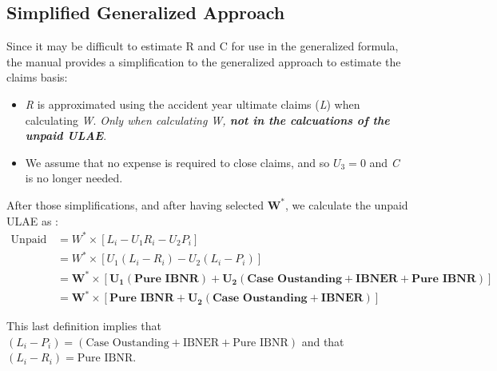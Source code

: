 \documentclass[11pt, english]{memoir}
\numberwithin{definition}{section}
\begin{document}
\subsection{Simplified Generalized Approach}	
	Since it may be difficult to estimate R and C for use in the generalized formula, the manual provides a simplification to the generalized approach to estimate the claims basis:
	\begin{itemize}
		\item \emph{R} is approximated using the accident year ultimate claims (\emph{L}) when calculating \emph{W}. \emph{Only when calculating \emph{W}, \textbf{not in the calcuations of the unpaid ULAE}}. 
		\item We assume that no expense is required to close claims, and so $ U_{3} = 0$ and \emph{C} is no longer needed. 
	\end{itemize}
	After those simplifications, and after having selected $ \mathbf{W^{*}} $, we calculate the unpaid ULAE as :
	\begin{align*}
	\text{Unpaid ULAE} &= W^{*} \times \left[ L_{i} - U_{1}R_{i} - U_{2}P_{i}\right]\\
	&= W^{*} \times \left[ U_{1}(L_{i} - R_{i}) - U_{2}(L_{i} - P_{i})\right]\\
	&= \mathbf{W^{*} \times \left[ U_{1}(\textbf{Pure IBNR}) + U_{2}(\textbf{Case Oustanding} + \textbf{IBNER}+ \textbf{Pure IBNR})\right]}\\
	&= \mathbf{W^{*} \times \left[ \textbf{Pure IBNR} + U_{2}(\textbf{Case Oustanding} + \textbf{IBNER})\right]}
	\end{align*}
	
	This last definition implies that $ (L_{i} - P_{i}) = (\text{Case Oustanding} + \text{IBNER}+ \text{Pure IBNR}) $ and that $ (L_{i} - R_{i}) = \text{Pure IBNR} $.
	
	
	
	
	
	
	
	
	
	
	
	
	
	
	
	
	
	
	
	
	
	
	
	
	
	
	
	
	
	
	
	
	
	
	
	
	
	
	
	
	
	
\end{document}
